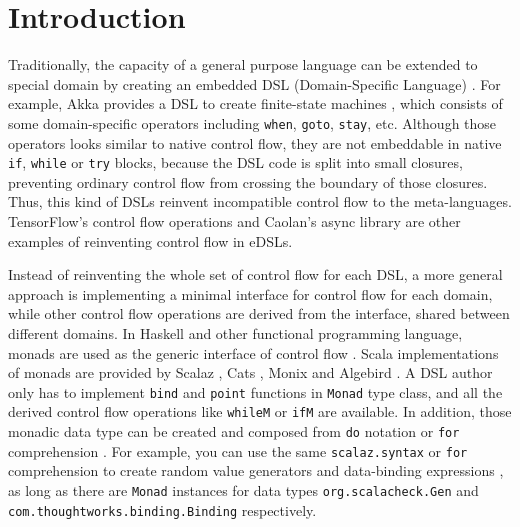 \section{Introduction}\label{Introduction}

Traditionally, the capacity of a general purpose language can be extended to special domain by creating an embedded DSL (Domain-Specific Language) \cite{fowler2010domain} . For example, Akka provides a DSL to create finite-state machines \cite{lightbend2017akka}, which consists of some domain-specific operators including \lstinline{when}, \lstinline{goto}, \lstinline{stay}, etc. Although those operators looks similar to native control flow, they are not embeddable in native \lstinline{if}, \lstinline{while} or \lstinline{try} blocks, because the DSL code is split into small closures, preventing ordinary control flow from crossing the boundary of those closures. Thus, this kind of DSLs reinvent incompatible control flow to the meta-languages. TensorFlow's control flow operations \cite{abadi2016tensorflow} and Caolan's async library \cite{caolan2017async} are other examples of reinventing control flow in eDSLs.

Instead of reinventing the whole set of control flow for each DSL, a more general approach is implementing a minimal interface for control flow for each domain, while other control flow operations are derived from the interface, shared between different domains. In Haskell and other functional programming language, monads are used as the generic interface of control flow \cite{wadler1990comprehending,wadler1992essence,jones1993composing}. Scala implementations of monads are provided by Scalaz \cite{kenji2017scalaz}, Cats \cite{typelevel2017cats}, Monix \cite{nedelcu2017monix} and Algebird \cite{twitter2016algebird}. A DSL author only has to implement \lstinline{bind} and \lstinline{point} functions in \lstinline{Monad} type class, and all the derived control flow operations like \lstinline{whileM} or \lstinline{ifM} are available. In addition, those monadic data type can be created and composed from \lstinline{do} notation \cite{jones1998haskell} or \lstinline{for} comprehension \cite{odersky2004scala}. For example, you can use the same \lstinline{scalaz.syntax} or \lstinline{for} comprehension to create random value generators \cite{nilsson2015scalacheck} and data-binding expressions \cite{yangbo2016binding}, as long as there are \lstinline{Monad} instances for data types \lstinline{org.scalacheck.Gen} and \lstinline{com.thoughtworks.binding.Binding} respectively.

